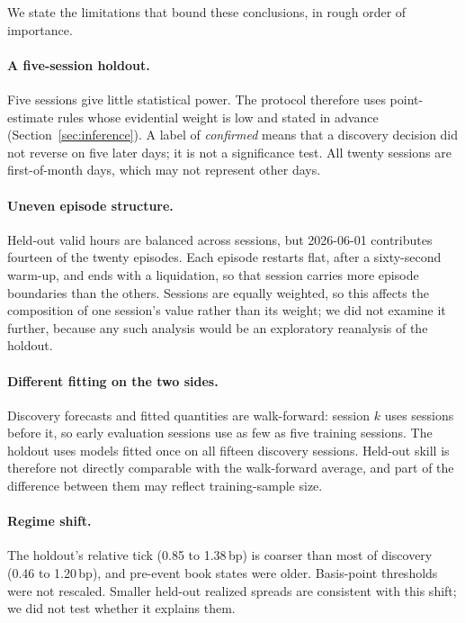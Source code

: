 \documentclass[11pt]{article}
\makeatletter
\newcommand{\bp}{\,bp}
\renewcommand\section{\@startsection{section}{1}{\z@}{-3.25ex\@plus -1ex \@minus -.2ex}{1.5ex \@plus .2ex}{\normalfont\large\bfseries}}
\makeatother
\begin{document}
\section{Limitations}\label{sec:limits}

We state the limitations that bound these conclusions, in rough order of importance.

\paragraph{A five-session holdout.} Five sessions give little statistical power. The protocol therefore uses
point-estimate rules whose evidential weight is low and stated in advance (Section~\ref{sec:inference}). A label of
\emph{confirmed} means that a discovery decision did not reverse on five later days; it is not a significance test.
All twenty sessions are first-of-month days, which may not represent other days.

\paragraph{Uneven episode structure.} Held-out valid hours are balanced across sessions, but 2026-06-01 contributes
fourteen of the twenty episodes. Each episode restarts flat, after a sixty-second warm-up, and ends with a liquidation,
so that session carries more episode boundaries than the others. Sessions are equally weighted, so this affects the
composition of one session's value rather than its weight; we did not examine it further, because any such analysis
would be an exploratory reanalysis of the holdout.

\paragraph{Different fitting on the two sides.} Discovery forecasts and fitted quantities are walk-forward: session $k$
uses sessions before it, so early evaluation sessions use as few as five training sessions. The holdout uses models fitted
once on all fifteen discovery sessions. Held-out skill is therefore not directly comparable with the walk-forward
average, and part of the difference between them may reflect training-sample size.

\paragraph{Regime shift.} The holdout's relative tick (0.85 to 1.38\bp) is coarser than most of discovery (0.46 to
1.20\bp), and pre-event book states were older. Basis-point thresholds were not rescaled. Smaller held-out realized spreads
are consistent with this shift; we did not test whether it explains them.
\end{document}
